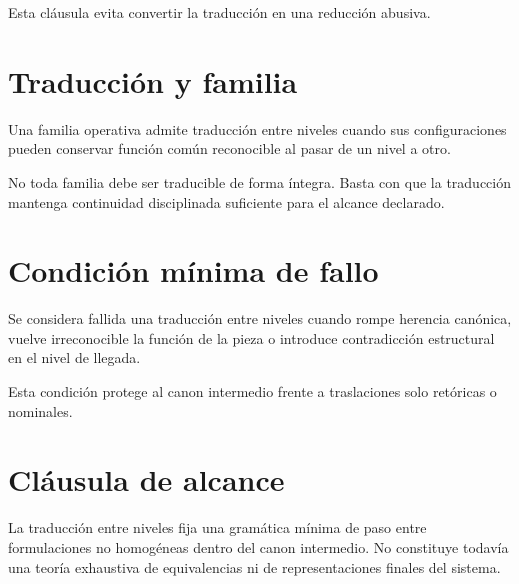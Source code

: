 \begin{observation}
Esta cláusula evita convertir la traducción en una reducción abusiva.
\end{observation}

\section{Traducción y familia}
\begin{definition}
Una familia operativa admite traducción entre niveles cuando sus configuraciones pueden conservar función común reconocible al pasar de un nivel a otro.
\end{definition}

\begin{observation}
No toda familia debe ser traducible de forma íntegra. Basta con que la traducción mantenga continuidad disciplinada suficiente para el alcance declarado.
\end{observation}

\section{Condición mínima de fallo}
\begin{definition}
Se considera fallida una traducción entre niveles cuando rompe herencia canónica, vuelve irreconocible la función de la pieza o introduce contradicción estructural en el nivel de llegada.
\end{definition}

\begin{observation}
Esta condición protege al canon intermedio frente a traslaciones solo retóricas o nominales.
\end{observation}

\section{Cláusula de alcance}
\begin{observation}
La traducción entre niveles fija una gramática mínima de paso entre formulaciones no homogéneas dentro del canon intermedio. No constituye todavía una teoría exhaustiva de equivalencias ni de representaciones finales del sistema.
\end{observation}

